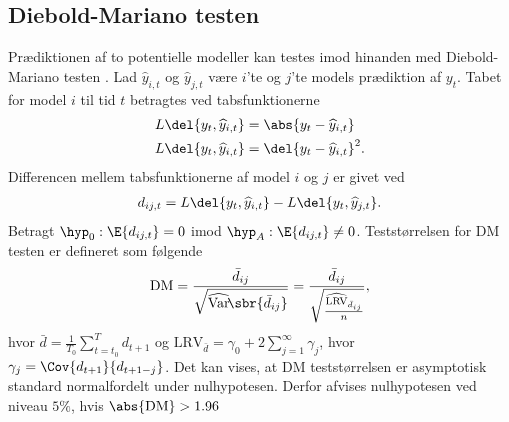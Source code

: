 \subsection{Diebold-Mariano testen}
Prædiktionen af to potentielle modeller kan testes imod hinanden med Diebold-Mariano testen \citep{dmtest}.
Lad \(\widehat{y}_{i,t}\) og \(\widehat{y}_{j,t}\) være \(i\)'te og \(j\)'te models prædiktion af \(y_{t}\).
Tabet for model \(i\) til tid \(t\) betragtes ved tabsfunktionerne
\begin{align}
L \del{y_t, \widehat{y}_{i,t}} &= \abs{y_t - \widehat{y}_{i,t}} \label{eq:lossMAE} \\
L \del{y_t, \widehat{y}_{i,t}} &= \del{y_t - \widehat{y}_{i,t}}^2. \label{eq:lossMSE}
\end{align}
Differencen mellem tabsfunktionerne af model \(i\) og \(j\) er givet ved 
\begin{align*}
d_{ij,t} = L \del{y_t, \widehat{y}_{i,t}} - L \del{y_t, \widehat{y}_{j,t}}.
\end{align*}
%
Betragt \(\hyp_0 : \E{d_{ij,t}} = 0\) imod \(\hyp_A: \E{d_{ij,t}} \neq 0\). Teststørrelsen for DM testen er defineret som følgende
\begin{align*}
\text{DM} = \frac{\bar{d}_{ij}}{\sqrt{\widehat{\mathrm{Var}}\!\sbr{\bar{d}_{ij}}}} =  \frac{\bar{d}_{ij}}{\sqrt{\frac{\widehat{\text{LRV}}_{\bar{d}_{ij}}}{n}}},
\end{align*}
hvor $\bar{d} = \frac{1}{T_0} \sum^{T}_{t = t_0} d_{t +1} $ og $\text{LRV}_{\bar{d}} = \gamma_0 + 2\sum_{j = 1}^{\infty} \gamma_j$, hvor $\gamma_j = \Cov{d_{t +1}}{d_{t+1-j}}$. 
%
Det kan vises, at DM teststørrelsen er asymptotisk standard normalfordelt under nulhypotesen. Derfor afvises nulhypotesen ved niveau $5 \%$, hvis $\abs{\text{DM}} > 1.96$